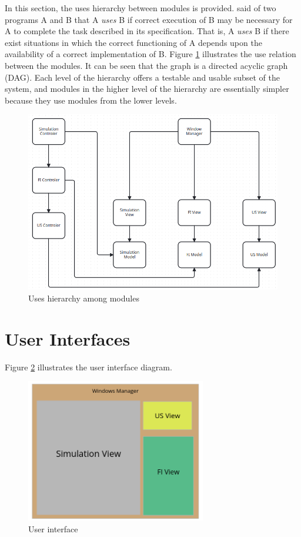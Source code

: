 \documentclass[12pt, titlepage]{article}
\begin{document}
In this section, the uses hierarchy between modules is
provided. \citet{Parnas1978} said of two programs A and B that A {\em uses} B if
correct execution of B may be necessary for A to complete the task described in
its specification. That is, A {\em uses} B if there exist situations in which
the correct functioning of A depends upon the availability of a correct
implementation of B.  Figure \ref{FigUH} illustrates the use relation between
the modules. It can be seen that the graph is a directed acyclic graph
(DAG). Each level of the hierarchy offers a testable and usable subset of the
system, and modules in the higher level of the hierarchy are essentially simpler
because they use modules from the lower levels.
\begin{figure}[H]
\centering
\includegraphics[width=1\textwidth]{UsesHierarchy.png}
\caption{Uses hierarchy among modules}
\label{FigUH}
\end{figure}

\section{User Interfaces}

Figure \ref{FigUI} illustrates the user interface diagram.

\begin{figure}[H]
  \centering
  \includegraphics[width=0.7\textwidth]{UI.png}
  \caption{User interface}
  \label{FigUI}
  \end{figure}
\end{document}
